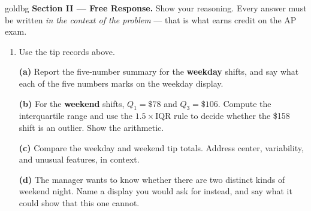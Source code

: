 \documentclass[12pt]{article}
\begin{document}
\boxguard[26]
\begin{headlinebox}{goldbg}
\small
\textbf{Section II --- Free Response.} Show your reasoning. Every answer must be written
\emph{in the context of the problem} --- that is what earns credit on the AP exam.
\end{headlinebox}

\vspace{0.10in}

\begin{enumerate}[leftmargin=1.9em, itemsep=0.16in, resume]

  \boxguard[20]
  \item Use the tip records above.

        \boxguard[17]
        \vspace{6pt}
        \textbf{(a)} Report the five-number summary for the \textbf{weekday} shifts, and say what
        each of the five numbers marks on the weekday display.\\[4pt]

        \boxguard[17]
        \vspace{6pt}
        \textbf{(b)} For the \textbf{weekend} shifts, $Q_1 = \$78$ and $Q_3 = \$106$. Compute the
        interquartile range and use the $1.5 \times \text{IQR}$ rule to decide whether the \$158
        shift is an outlier. Show the arithmetic.\\[4pt]

        \boxguard[17]
        \vspace{6pt}
        \textbf{(c)} Compare the weekday and weekend tip totals. Address center, variability, and
        unusual features, in context.\\[4pt]

        \boxguard[17]
        \vspace{6pt}
        \textbf{(d)} The manager wants to know whether there are two distinct kinds of weekend
        night. Name a display you would ask for instead, and say what it could show that this one
        cannot.\\[4pt]

\end{enumerate}
\end{document}
